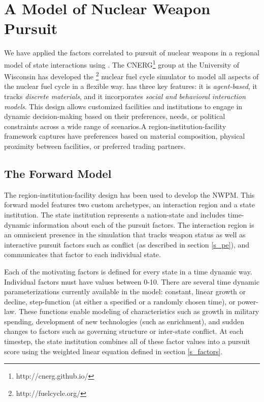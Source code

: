 \section{A \Cyclus Model of Nuclear Weapon Pursuit}
\label{s_methods}

We have applied the factors correlated to pursuit of nuclear weapons in a regional model of state interactions using \Cyclus.  The \gls{CNERG}\footnote{http://cnerg.github.io/} group at the University of Wisconsin has developed the \Cyclus\footnote{http://fuelcycle.org/} nuclear fuel cycle simulator to model all aspects of the nuclear fuel cycle in a flexible way.  \Cyclus has three key features: it is \textit{agent-based}, it tracks \textit{discrete materials}, and it incorporates \textit{social and behavioral interaction models}\cite{jennings_agent-based_2000, gidden_agent-based_2013, taylor2014agent}. This design allows customized facilities and institutions to engage in dynamic decision-making based on their preferences, needs, or political constraints across a wide range of scenarios.A region-institution-facility framework captures have preferences based on material composition, physical proximity between facilities, or preferred trading partners.

\subsection{The Forward Model}

The region-institution-facility design has been used to develop the \gls{NWPM}. This forward model features two custom archetypes, an interaction region and a state institution\cite{mbmore}.  The state institution represents a nation-state and includes time-dynamic information about each of the pursuit factors. The interaction region is an omniscient presence in the simulation that tracks weapon status as well as interactive pursuit factors such as conflict (as described in section \ref{s_pe}), and communicates that factor to each individual state. 

Each of the motivating factors is defined for every state in a time dynamic way. Individual factors must have values between 0-10. There are several time dynamic parameterizations currently available in the model: constant, linear growth or decline, step-function (at either a specified or a randomly chosen time), or power-law.  These functions enable modeling of characteristics such as growth in military spending, development of new technologies (such as enrichment), and sudden changes to factors such as governing structure or inter-state conflict.  At each timestep, the state institution combines all of these factor values into a pursuit score using the weighted linear equation defined in section \ref{s_factors}.

